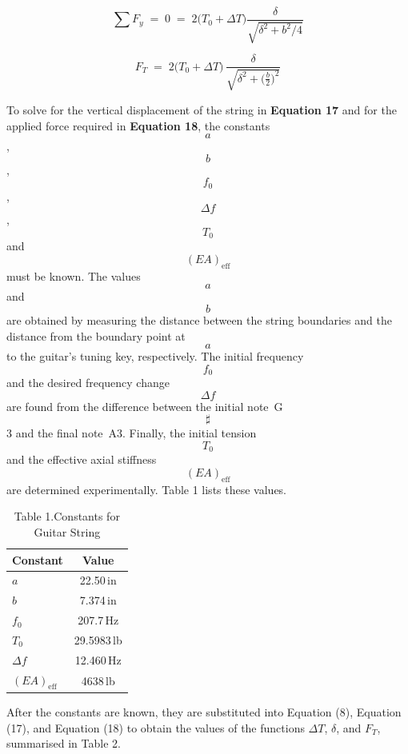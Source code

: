 \documentclass[12pt]{article}
\theoremstyle{definition} %
\theoremstyle{plain} %
\begin{document}
\begin{equation}
  \sum F_y \;=\; 0
  \;=\;
  2\bigl(T_0+\Delta T\bigr)
  \frac{\delta}{\sqrt{\delta^{2}+b^{2}/4}}
  \tag{18}
\end{equation}

\begin{equation}
  F_T
  \;=\;
  2\bigl(T_0+\Delta T\bigr)\,
  \frac{\delta}{\sqrt{\delta^{2}+\bigl(\frac{b}{2}\bigr)^{2}}}
  \tag{19}
\end{equation}

To solve for the vertical displacement of the string in \textbf{Equation 17}
and for the applied force required in \textbf{Equation 18}, the constants
$$a$$, $$b$$, $$f_0$$, $$\Delta f$$, $$T_0$$ and $$(EA)_{\text{eff}}$$
must be known.  The values $$a$$ and $$b$$ are obtained by measuring the
distance between the string boundaries and the distance from the boundary
point at $$a$$ to the guitar’s tuning key, respectively.  The initial
frequency $$f_0$$ and the desired frequency change $$\Delta f$$ are found
from the difference between the initial note~G$$\sharp$$3 and the final
note~A3.  Finally, the initial tension $$T_0$$ and the effective axial
stiffness $$(EA)_{\text{eff}}$$ are determined experimentally.
Table 1 lists these values.

\begin{table}[ht]
  \centering
  \caption*{Table 1.\;Constants for Guitar String}
  \begin{tabular}{|l|c|}
  \hline
  \textbf{Constant} & \textbf{Value} \\ \hline
  $a$               & 22.50\,in \\ \hline
  $b$               & 7.374\,in \\ \hline
  $f_0$             & 207.7\,Hz \\ \hline
  $T_0$             & 29.5983\,lb \\ \hline
  $\Delta f$        & 12.460\,Hz \\ \hline
  $(EA)_{\text{eff}}$ & 4638\,lb \\ \hline
  \end{tabular}
  \end{table}
  
  After the constants are known, they are substituted into
  Equation (8), Equation (17), and Equation (18) to obtain
  the values of the functions $\Delta T$, $\delta$, and $F_T$,
  summarised in Table 2.
  
\end{document}
